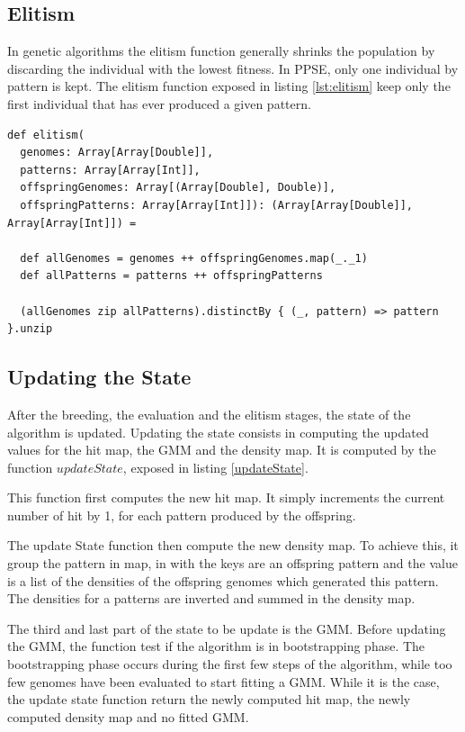 \documentclass[10pt,a4paper]{article}
\theoremstyle{definition}
\theoremstyle{remark}
\begin{document}
\subsection{Elitism}

In genetic algorithms the elitism function generally shrinks the population by discarding the individual with the lowest fitness. In PPSE, only one individual by pattern is kept. The elitism function exposed in listing \ref{lst:elitism} keep only the first individual that has ever produced a given pattern.

\begin{lstlisting}[caption={Elitism function},label={lst:elitism}]
def elitism(
  genomes: Array[Array[Double]],
  patterns: Array[Array[Int]],
  offspringGenomes: Array[(Array[Double], Double)],
  offspringPatterns: Array[Array[Int]]): (Array[Array[Double]], Array[Array[Int]]) =

  def allGenomes = genomes ++ offspringGenomes.map(_._1)
  def allPatterns = patterns ++ offspringPatterns

  (allGenomes zip allPatterns).distinctBy { (_, pattern) => pattern }.unzip
\end{lstlisting}


\subsection{Updating the State}\label{sec. updateState}

After the breeding, the evaluation and the elitism stages, the state of the algorithm is updated. Updating the state consists in computing the updated values for the hit map, the GMM and the density map. It is computed by the function $updateState$, exposed in listing \ref{updateState}. 

This function first computes the new hit map. It simply increments the current number of hit by 1, for each pattern produced by the offspring.

The update State function then compute the new density map. To achieve this, it group the pattern in map, in with the keys are an offspring pattern and the value is a list of the densities of the offspring genomes which generated this pattern. The densities for a patterns are inverted and summed in the density map.

The third and last part of the state to be update is the GMM. Before updating the GMM, the function test if the algorithm is in bootstrapping phase. The bootstrapping phase occurs during the first few steps of the algorithm, while too few genomes have been evaluated to start fitting a GMM. While it is the case, the update state function return the newly computed hit map, the newly computed density map and no fitted GMM.
\end{document}
